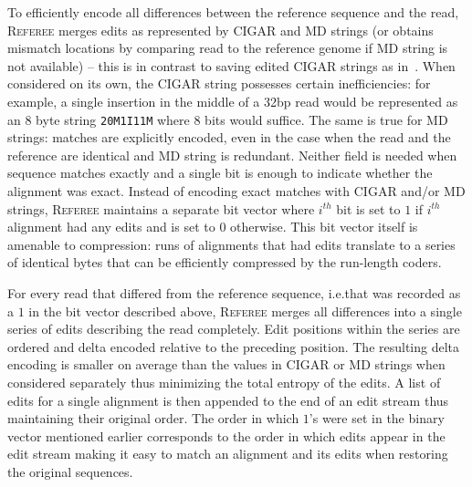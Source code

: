 \documentclass[12pt]{cmuthesis}
\newcommand{\refer}{\textsc{Referee}\xspace}
\begin{document}
  To efficiently encode all differences between the reference sequence and the read, \refer merges edits as represented by CIGAR and MD strings (or obtains mismatch locations by comparing read to the reference genome if MD string is not available) -- this is in contrast to saving edited CIGAR strings as in~\cite{Sahinalp2015}.  When considered on its own, the CIGAR string possesses certain inefficiencies: for example, a single insertion in the middle of a 32bp read would be represented as an 8 byte string \texttt{20M1I11M} where 8 bits would suffice. The same is true for MD strings: matches are explicitly encoded, even in the case when the read and the reference are identical and MD string is redundant. Neither field is needed when sequence matches exactly and a single bit is enough to indicate whether the alignment was exact. Instead of encoding exact matches with CIGAR and/or MD strings, \refer maintains a separate bit vector where $i^{th}$ bit is set to $1$ if $i^{th}$ alignment had any edits and is set to $0$ otherwise. This bit vector itself is amenable to compression: runs of alignments that had edits translate to a series of identical bytes that can be efficiently compressed by the run-length coders.

  For every read that differed from the reference sequence, i.e.\@ that was recorded as a $1$ in the bit vector described above, \refer merges all differences into a single series of edits describing the read completely. Edit positions within the series are ordered and delta encoded relative to the preceding position. The resulting delta encoding is smaller on average than the values in CIGAR or MD strings when considered separately thus minimizing the total entropy of the edits. A list of edits for a single alignment is then appended to the end of an edit stream thus maintaining their original order. The order in which $1$'s were set in the binary vector mentioned earlier corresponds to the order in which edits appear in the edit stream making it easy to match an alignment and its edits when restoring the original sequences. 
\end{document}

